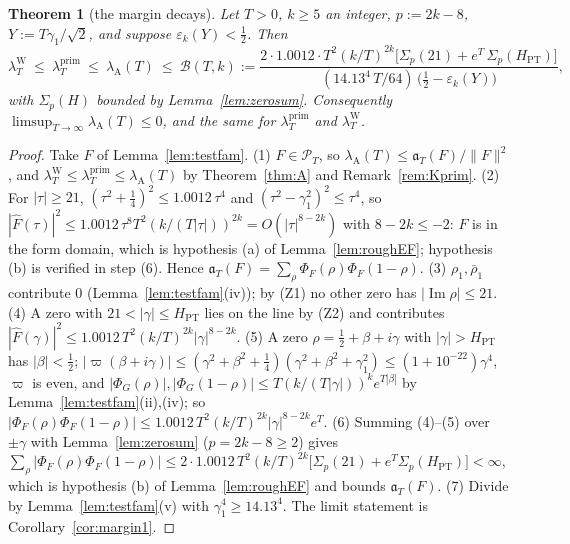 \documentclass[11pt]{amsart}
\newtheorem{theorem}{Theorem}[section]
\theoremstyle{definition}
\theoremstyle{remark}
\newcommand{\Iml}{\operatorname{Im}}
\newcommand{\PT}{\mathcal P_T}
\newcommand{\lamP}{\lambda^{\mathrm{prim}}_T}
\newcommand{\lamW}{\lambda^{\mathrm W}_T}
\newcommand{\lamA}{\lambda_{\mathrm A}(T)}
\newcommand{\Fh}{\widehat F}
\begin{document}
\begin{theorem}[the margin decays]\label{thm:margin}
Let $T>0$, $k\ge5$ an integer, $p:=2k-8$, $Y:=T\gamma_1/\sqrt2$, and suppose $\varepsilon_k(Y)<\frac12$. Then
\begin{equation}\label{eq:Bmargin}
\lamW\ \le\ \lamP\ \le\ \lamA\ \le\ \mathcal B(T,k):=
\frac{2\cdot1.0012\cdot T^2(k/T)^{2k}\big[\Sigma_p(21)+e^T\,\Sigma_p(H_{\mathrm{PT}})\big]}
{(14.13^4\,T/64)\,\big(\frac12-\varepsilon_k(Y)\big)},
\end{equation}
with $\Sigma_p(H)$ bounded by Lemma~\ref{lem:zerosum}. Consequently $\limsup_{T\to\infty}\lamA\le0$, and the
same for $\lamP$ and $\lamW$.
\end{theorem}
\begin{proof}
Take $F$ of Lemma~\ref{lem:testfam}. (1) $F\in\PT$, so $\lamA\le\mathfrak a_T(F)/\|F\|^2$, and
$\lamW\le\lamP\le\lamA$ by Theorem~\ref{thm:A} and Remark~\ref{rem:Kprim}.
(2) For $|\tau|\ge21$, $(\tau^2+\frac14)^2\le1.0012\,\tau^4$ and $(\tau^2-\gamma_1^2)^2\le\tau^4$, so
$|\Fh(\tau)|^2\le1.0012\,\tau^8T^2(k/(T|\tau|))^{2k}=O(|\tau|^{8-2k})$ with $8-2k\le-2$: $F$ is in the
form domain, which is hypothesis (a) of Lemma~\ref{lem:roughEF}; hypothesis (b) is verified in step (6).
Hence $\mathfrak a_T(F)=\sum_\rho\Phi_F(\rho)\Phi_F(1-\rho)$.
(3) $\rho_1,\bar\rho_1$ contribute $0$ (Lemma~\ref{lem:testfam}(iv)); by (Z1) no other zero has $|\Iml\rho|\le21$.
(4) A zero with $21<|\gamma|\le H_{\mathrm{PT}}$ lies on the line by (Z2) and contributes
$|\Fh(\gamma)|^2\le1.0012\,T^2(k/T)^{2k}|\gamma|^{8-2k}$.
(5) A zero $\rho=\frac12+\beta+i\gamma$ with $|\gamma|>H_{\mathrm{PT}}$ has $|\beta|<\frac12$;
$|\varpi(\beta+i\gamma)|\le(\gamma^2+\beta^2+\frac14)(\gamma^2+\beta^2+\gamma_1^2)\le(1+10^{-22})\gamma^4$, $\varpi$ is even,
and $|\Phi_G(\rho)|,|\Phi_G(1-\rho)|\le T(k/(T|\gamma|))^ke^{T|\beta|}$ by Lemma~\ref{lem:testfam}(ii),(iv);
so $|\Phi_F(\rho)\Phi_F(1-\rho)|\le1.0012\,T^2(k/T)^{2k}|\gamma|^{8-2k}e^T$.
(6) Summing (4)--(5) over $\pm\gamma$ with Lemma~\ref{lem:zerosum} ($p=2k-8\ge2$) gives
$\sum_\rho|\Phi_F(\rho)\Phi_F(1-\rho)|\le2\cdot1.0012\,T^2(k/T)^{2k}\big[\Sigma_p(21)+e^T\Sigma_p(H_{\mathrm{PT}})\big]<\infty$,
which is hypothesis (b) of Lemma~\ref{lem:roughEF} and bounds $\mathfrak a_T(F)$.
(7) Divide by Lemma~\ref{lem:testfam}(v) with $\gamma_1^4\ge14.13^4$. The limit statement is
Corollary~\ref{cor:margin1}.
\end{proof}
\end{document}
